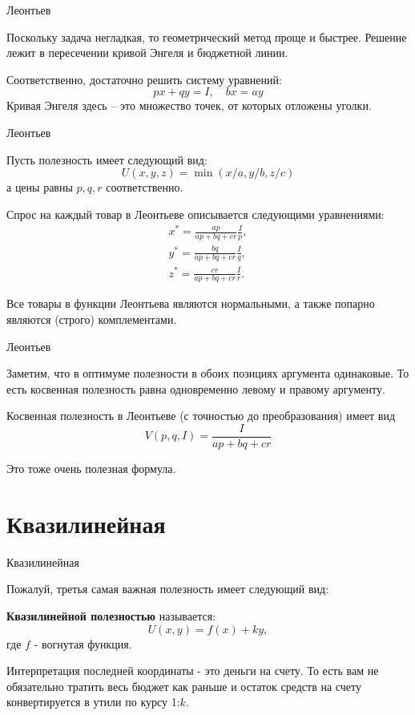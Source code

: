 \documentclass{beamer}
\begin{document}
\begin{frame}{Леонтьев}

Поскольку задача негладкая, то геометрический метод проще и быстрее. Решение лежит в пересечении кривой Энгеля и бюджетной линии. 

Соответственно, достаточно решить систему уравнений:
$$ px + qy = I, \quad b x = a y$$
Кривая Энгеля здесь – это множество точек, от которых отложены уголки.

\end{frame}

\begin{frame}{Леонтьев}

Пусть полезность имеет следующий вид:
$$U(x,y,z) = \min(x/a, y/b, z/c)$$ 
а цены равны $p, q, r$ соответственно. 

Спрос на каждый товар в Леонтьеве описывается следующими уравнениями:
\begin{gather*}
x^{\ast} = \frac{ap}{ap + bq + cr} \frac{I}{p}, \\
y^{\ast} = \frac{bq}{ap + bq + cr} \frac{I}{q}, \\
z^{\ast} = \frac{cr}{ap + bq + cr} \frac{I}{r}.
\end{gather*}

Все товары в функции Леонтьева являются нормальными, а также попарно являются (строго) комплементами.

\end{frame}

\begin{frame}{Леонтьев}

Заметим, что в оптимуме полезности в обоих позициях аргумента одинаковые. То есть косвенная полезность равна одновременно левому и правому аргументу.


Косвенная полезность в Леонтьеве (с точностью до преобразования) имеет вид
$$V(p,q,I) = \frac{I}{ap + bq + cr}$$

Это тоже очень полезная формула.

\end{frame}

\section{Квазилинейная}

\begin{frame}{Квазилинейная}

Пожалуй, третья самая важная полезность имеет следующий вид:

\begin{definition}
\textbf{Квазилинейной полезностью} называется:
$$U(x, y) = f(x) + k y,$$ 
где $f$ - вогнутая функция.
\end{definition}

Интерпретация последней координаты - это деньги на счету. То есть вам не обязательно тратить весь бюджет как раньше и остаток средств на счету конвертируется в утили по курсу 1:$k$.

\end{frame}
\end{document}
